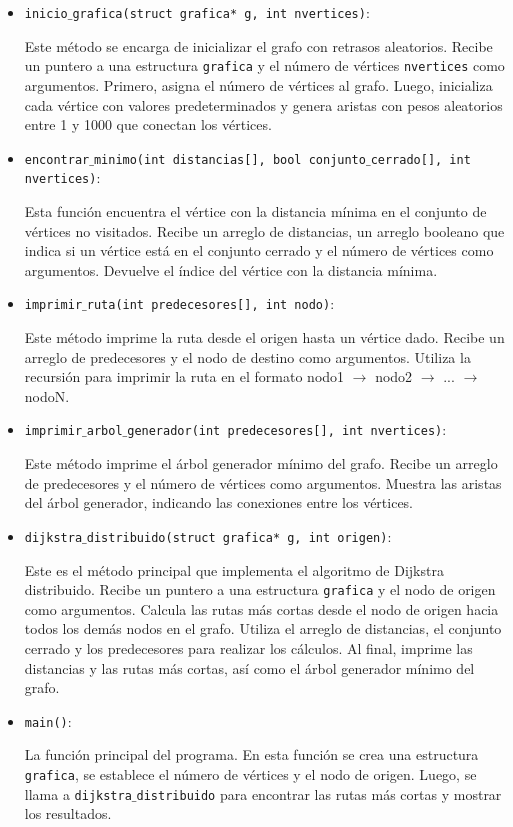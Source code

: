 \documentclass[a4paper,12pt]{article}
\begin{document}
\begin{itemize}
    \item \texttt{inicio$\_$grafica(struct grafica* g, int nvertices)}:
    
    Este método se encarga de inicializar el grafo con retrasos aleatorios. Recibe un puntero a una estructura \texttt{grafica} y el número de vértices \texttt{nvertices} como argumentos. Primero, asigna el número de vértices al grafo. Luego, inicializa cada vértice con valores predeterminados y genera aristas con pesos aleatorios entre 1 y 1000 que conectan los vértices.

    \item \texttt{encontrar$\_$minimo(int distancias[], bool conjunto$\_$cerrado[], int nvertices)}: 
    
    Esta función encuentra el vértice con la distancia mínima en el conjunto de vértices no visitados. Recibe un arreglo de distancias, un arreglo booleano que indica si un vértice está en el conjunto cerrado y el número de vértices como argumentos. Devuelve el índice del vértice con la distancia mínima.

    \item \texttt{imprimir$\_$ruta(int predecesores[], int nodo)}:
    
    Este método imprime la ruta desde el origen hasta un vértice dado. Recibe un arreglo de predecesores y el nodo de destino como argumentos. Utiliza la recursión para imprimir la ruta en el formato nodo1 $\rightarrow$ nodo2 $\rightarrow$ ... $\rightarrow$ nodoN.

    \item \texttt{imprimir$\_$arbol$\_$generador(int predecesores[], int nvertices)}: 
    
    Este método imprime el árbol generador mínimo del grafo. Recibe un arreglo de predecesores y el número de vértices como argumentos. Muestra las aristas del árbol generador, indicando las conexiones entre los vértices.

    \item \texttt{dijkstra$\_$distribuido(struct grafica* g, int origen)}: 
    
    Este es el método principal que implementa el algoritmo de Dijkstra distribuido. Recibe un puntero a una estructura \texttt{grafica} y el nodo de origen como argumentos. Calcula las rutas más cortas desde el nodo de origen hacia todos los demás nodos en el grafo. Utiliza el arreglo de distancias, el conjunto cerrado y los predecesores para realizar los cálculos. Al final, imprime las distancias y las rutas más cortas, así como el árbol generador mínimo del grafo.

    \item \texttt{main()}: 
    
    La función principal del programa. En esta función se crea una estructura \texttt{grafica}, se establece el número de vértices y el nodo de origen. Luego, se llama a \texttt{dijkstra$\_$distribuido} para encontrar las rutas más cortas y mostrar los resultados.
\end{itemize}
\end{document}
